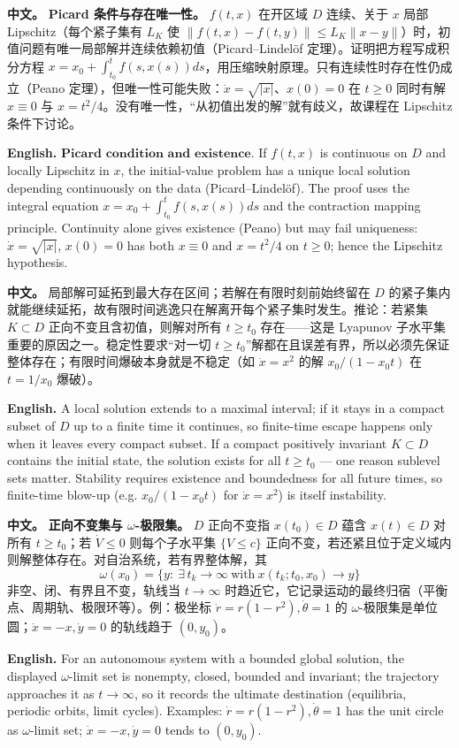 \documentclass[UTF8,11pt,a4paper]{ctexart}
\newcommand{\APS}[2]{\par\noindent\textbf{中文。} #1\par\noindent\textbf{English.} #2\par}
\newcommand{\norm}[1]{\lVert #1\rVert}\newcommand{\abs}[1]{\lvert #1\rvert}
\begin{document}
\APS{\textbf{Picard 条件与存在唯一性。} $f(t,x)$ 在开区域 $D$ 连续、关于 $x$ 局部 Lipschitz（每个紧子集有 $L_K$ 使 $\norm{f(t,x)-f(t,y)}\le L_K\norm{x-y}$）时，初值问题有唯一局部解并连续依赖初值（Picard--Lindel\"of 定理）。证明把方程写成积分方程 $x=x_0+\int_{t_0}^tf(s,x(s))ds$，用压缩映射原理。只有连续性时存在性仍成立（Peano 定理），但唯一性可能失败：$\dot x=\sqrt{\abs{x}}$、$x(0)=0$ 在 $t\ge0$ 同时有解 $x\equiv0$ 与 $x=t^2/4$。没有唯一性，“从初值出发的解”就有歧义，故课程在 Lipschitz 条件下讨论。}{$\textbf{Picard condition and existence.}$ If $f(t,x)$ is continuous on $D$ and locally Lipschitz in $x$, the initial-value problem has a unique local solution depending continuously on the data (Picard--Lindel\"of). The proof uses the integral equation $x=x_0+\int_{t_0}^tf(s,x(s))ds$ and the contraction mapping principle. Continuity alone gives existence (Peano) but may fail uniqueness: $\dot x=\sqrt{\abs{x}}$, $x(0)=0$ has both $x\equiv0$ and $x=t^2/4$ on $t\ge0$; hence the Lipschitz hypothesis.}

\APS{局部解可延拓到最大存在区间；若解在有限时刻前始终留在 $D$ 的紧子集内就能继续延拓，故有限时间逃逸只在解离开每个紧子集时发生。推论：若紧集 $K\subset D$ 正向不变且含初值，则解对所有 $t\ge t_0$ 存在——这是 Lyapunov 子水平集重要的原因之一。稳定性要求“对一切 $t\ge t_0$”解都在且误差有界，所以必须先保证整体存在；有限时间爆破本身就是不稳定（如 $\dot x=x^2$ 的解 $x_0/(1-x_0t)$ 在 $t=1/x_0$ 爆破）。}{A local solution extends to a maximal interval; if it stays in a compact subset of $D$ up to a finite time it continues, so finite-time escape happens only when it leaves every compact subset. If a compact positively invariant $K\subset D$ contains the initial state, the solution exists for all $t\ge t_0$ — one reason sublevel sets matter. Stability requires existence and boundedness for all future times, so finite-time blow-up (e.g. $x_0/(1-x_0t)$ for $\dot x=x^2$) is itself instability.}

\APS{\textbf{正向不变集与 $\omega$-极限集。} $D$ 正向不变指 $x(t_0)\in D$ 蕴含 $x(t)\in D$ 对所有 $t\ge t_0$；若 $\dot V\le0$ 则每个子水平集 $\{V\le c\}$ 正向不变，若还紧且位于定义域内则解整体存在。对自治系统，若有界整体解，其
\[
\omega(x_0)=\{y:\ \exists\,t_k\to\infty\ \text{with}\ x(t_k;t_0,x_0)\to y\}
\]
非空、闭、有界且不变，轨线当 $t\to\infty$ 时趋近它，它记录运动的最终归宿（平衡点、周期轨、极限环等）。例：极坐标 $\dot r=r(1-r^2),\dot\theta=1$ 的 $\omega$-极限集是单位圆；$\dot x=-x,\dot y=0$ 的轨线趋于 $(0,y_0)$。}{For an autonomous system with a bounded global solution, the displayed $\omega$-limit set is nonempty, closed, bounded and invariant; the trajectory approaches it as $t\to\infty$, so it records the ultimate destination (equilibria, periodic orbits, limit cycles). Examples: $\dot r=r(1-r^2),\dot\theta=1$ has the unit circle as $\omega$-limit set; $\dot x=-x,\dot y=0$ tends to $(0,y_0)$.}
\end{document}
